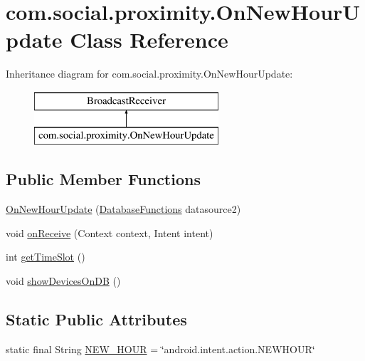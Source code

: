 \hypertarget{classcom_1_1social_1_1proximity_1_1_on_new_hour_update}{}\section{com.\+social.\+proximity.\+On\+New\+Hour\+Update Class Reference}
\label{classcom_1_1social_1_1proximity_1_1_on_new_hour_update}
Inheritance diagram for com.\+social.\+proximity.\+On\+New\+Hour\+Update\+:\begin{figure}[H]
\begin{center}
\leavevmode
\includegraphics[height=2.000000cm]{classcom_1_1social_1_1proximity_1_1_on_new_hour_update}
\end{center}
\end{figure}
\subsection*{Public Member Functions}
\begin{DoxyCompactItemize}
\item 
\hyperlink{classcom_1_1social_1_1proximity_1_1_on_new_hour_update_abd74ec78f0b1aa902641a2bbf868bbe7}{On\+New\+Hour\+Update} (\hyperlink{classcom_1_1social_1_1proximity_1_1_database_functions}{Database\+Functions} datasource2)
\item 
void \hyperlink{classcom_1_1social_1_1proximity_1_1_on_new_hour_update_a38534c234c903ea13d2321d11c85d72d}{on\+Receive} (Context context, Intent intent)
\item 
int \hyperlink{classcom_1_1social_1_1proximity_1_1_on_new_hour_update_af48a45ab9f45c3a5892c317c5e075231}{get\+Time\+Slot} ()
\item 
void \hyperlink{classcom_1_1social_1_1proximity_1_1_on_new_hour_update_a2f97517684a2248a9d1928c1927cdae6}{show\+Devices\+On\+D\+B} ()
\end{DoxyCompactItemize}
\subsection*{Static Public Attributes}
\begin{DoxyCompactItemize}
\item 
static final String \hyperlink{classcom_1_1social_1_1proximity_1_1_on_new_hour_update_a4d16e6c5468afd333dc75b972efc05e9}{N\+E\+W\+\_\+\+H\+O\+U\+R} = \char`\"{}android.\+intent.\+action.\+N\+E\+W\+H\+O\+U\+R\char`\"{}
\end{DoxyCompactItemize}

